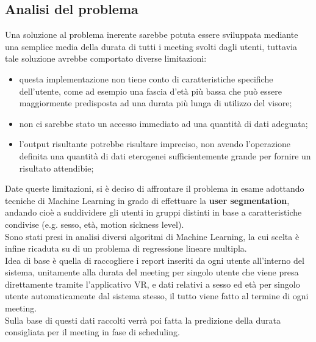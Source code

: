 \subsection{Analisi del problema}
\fancyhead{}    %
\label{paragrafo 1.3}
\par{
Una soluzione al problema inerente sarebbe potuta essere sviluppata mediante una semplice media della durata di tutti i meeting svolti dagli utenti, tuttavia tale soluzione avrebbe comportato diverse limitazioni:
\begin{itemize}
    \item questa implementazione non tiene conto di caratteristiche specifiche dell'utente, come ad esempio una fascia d'età più bassa che può essere maggiormente predisposta ad una durata più lunga di utilizzo del visore;
    \item non ci sarebbe stato un accesso immediato ad una quantità di dati adeguata;
    \item l'output risultante potrebbe risultare impreciso, non avendo l'operazione definita una quantità di dati eterogenei sufficientemente grande per fornire un risultato attendibie;
\end{itemize}
Date queste limitazioni, si è deciso di affrontare il problema in esame adottando tecniche di Machine Learning in grado di effettuare la \textbf{user segmentation}, andando cioè a suddividere gli utenti in gruppi distinti in base a caratteristiche condivise (e.g. sesso, età, motion sickness level).\\
Sono stati presi in analisi diversi algoritmi di Machine Learning, la cui scelta è infine ricaduta su di un problema di regressione lineare multipla.\\
Idea di base è quella di raccogliere i report inseriti da ogni utente all'interno del sistema, unitamente alla durata del meeting per singolo utente che viene presa direttamente tramite l'applicativo VR, e dati relativi a sesso ed età per singolo utente automaticamente dal sistema stesso, il tutto viene fatto al termine di ogni meeting.\\
Sulla base di questi dati raccolti verrà poi fatta la predizione della durata consigliata per il meeting in fase di scheduling.
}